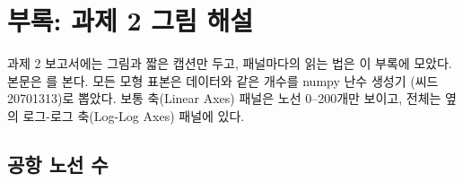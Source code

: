 \chapter{부록: 과제 2 그림 해설}
\label{ch:hw2-figure-notes}

과제 2 보고서에는 그림과 짧은 캡션만 두고, 패널마다의 읽는 법은 이 부록에 모았다.
본문은 를 본다. 모든 모형 표본은 데이터와 같은 개수를 numpy 난수 생성기
(씨드 20701313)로 뽑았다. 보통 축(Linear Axes) 패널은 노선 0--200개만 보이고, 전체는
옆의 로그-로그 축(Log-Log Axes) 패널에 있다.

\section{공항 노선 수}
\label{sec:hw2app-airport}

